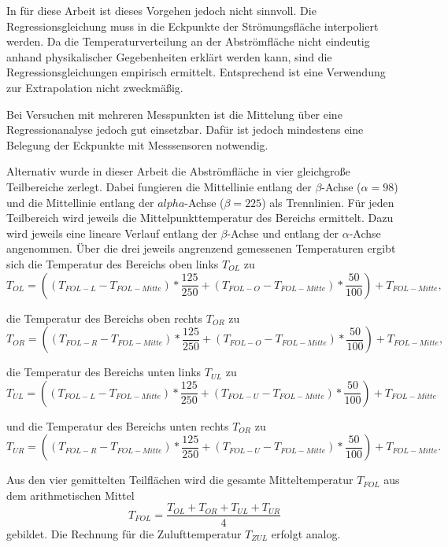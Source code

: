 In für diese Arbeit ist dieses Vorgehen jedoch nicht sinnvoll. Die Regressionsgleichung muss in die Eckpunkte der Strömungsfläche interpoliert werden. Da die Temperaturverteilung an der Abströmfläche nicht eindeutig anhand physikalischer Gegebenheiten erklärt werden kann, sind die Regressionsgleichungen empirisch ermittelt. Entsprechend ist eine Verwendung zur Extrapolation nicht zweckmäßig. 

Bei Versuchen mit mehreren Messpunkten ist die Mittelung über eine Regressionanalyse jedoch gut einsetzbar. Dafür ist jedoch mindestens eine Belegung der Eckpunkte mit Messsensoren notwendig.

Alternativ wurde in dieser Arbeit die Abströmfläche in vier gleichgroße Teilbereiche zerlegt. Dabei fungieren die Mittellinie entlang der $\beta$-Achse ($\alpha = 98$) und die Mittellinie entlang der $alpha$-Achse ($\beta = 225$) als Trennlinien. Für jeden Teilbereich wird jeweils die Mittelpunkttemperatur des Bereichs ermittelt. Dazu wird jeweils eine lineare Verlauf entlang der  $\beta$-Achse und entlang der  $\alpha$-Achse angenommen. Über die drei jeweils angrenzend gemessenen Temperaturen ergibt sich die Temperatur des Bereichs oben links $T_{OL}$ zu 
\begin{equation}
T_{OL} = ((T_{FOL-L}-T_{FOL-Mitte})*\frac{125}{250}+(T_{FOL-O}-T_{FOL-Mitte})*\frac{50}{100})+T_{FOL-Mitte},
\end{equation}

die Temperatur des Bereichs oben rechts $T_{OR}$ zu
\begin{equation}
T_{OR} = ((T_{FOL-R}-T_{FOL-Mitte})*\frac{125}{250}+(T_{FOL-O}-T_{FOL-Mitte})*\frac{50}{100})+T_{FOL-Mitte},
\end{equation}

die Temperatur des Bereichs unten links $T_{UL}$ zu
\begin{equation}
T_{UL} = ((T_{FOL-L}-T_{FOL-Mitte})*\frac{125}{250}+(T_{FOL-U}-T_{FOL-Mitte})*\frac{50}{100})+T_{FOL-Mitte}
\end{equation}

und die Temperatur des Bereichs unten rechts $T_{OR}$ zu
\begin{equation}
T_{UR} = ((T_{FOL-R}-T_{FOL-Mitte})*\frac{125}{250}+(T_{FOL-U}-T_{FOL-Mitte})*\frac{50}{100})+T_{FOL-Mitte}.
\end{equation}



Aus den vier gemittelten Teilflächen wird die gesamte Mitteltemperatur $T_{FOL}$ aus dem arithmetischen Mittel  
\begin{equation}
T_{FOL} = \frac{T_{OL}+T_{OR}+T_{UL}+T_{UR}}{4}
\end{equation}
gebildet. 
Die Rechnung für die Zulufttemperatur $T_{ZUL}$ erfolgt analog.








